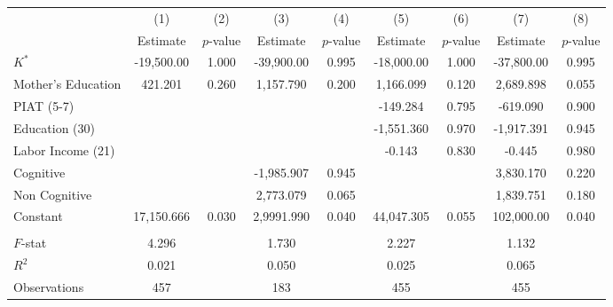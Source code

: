 \begin{tabular}{lcccccccc} \toprule
 & (1) & (2) & (3) & (4) & (5) & (6) & (7) & (8) \\
 & Estimate  & $p$-value  & Estimate  & $p$-value  & Estimate  & $p$-value  & Estimate  & $p$-value  \\  \midrule
$K^\ast$ & -19,500.00 &     1.000 & -39,900.00 &     0.995 & -18,000.00 &     1.000 & -37,800.00 &     0.995 \\
Mother's Education &   421.201 &     0.260 &  1,157.790 &     0.200 &  1,166.099 &     0.120 &  2,689.898 &     0.055 \\
PIAT (5-7) &         &         &         &         &  -149.284 &     0.795 &  -619.090 &     0.900 \\
Education (30) &         &         &         &         & -1,551.360 &     0.970 & -1,917.391 &     0.945 \\
Labor Income (21) &         &         &         &         &    -0.143 &     0.830 &    -0.445 &     0.980 \\
Cognitive &         &         & -1,985.907 &     0.945 &         &         &  3,830.170 &     0.220 \\
Non Cognitive &         &         &  2,773.079 &     0.065 &         &         &  1,839.751 &     0.180 \\
Constant & 17,150.666 &     0.030 & 2,9991.990 &     0.040 & 44,047.305 &     0.055 &  102,000.00 &     0.040 \\  \\ \midrule
$F$-stat &     4.296 &         &     1.730 &         &     2.227 &         &     1.132 &        \\
$R^2$ &     0.021 &         &     0.050 &         &     0.025 &         &     0.065 &        \\
Observations &   457 &         &   183 &         &   455 &         &   455 &        \\
\bottomrule \end{tabular}
